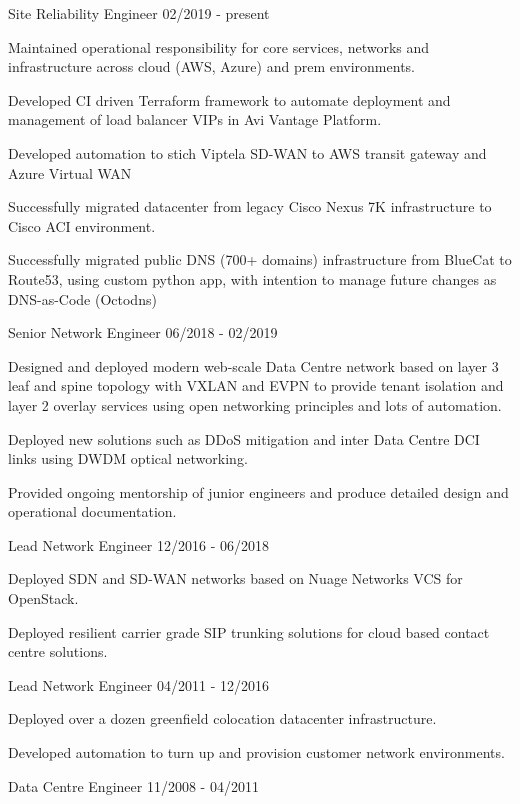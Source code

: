 \documentclass[11pt]{article} %
\begin{document}
\begin{description}
\squish
{}
           {Site Reliability Engineer}
           {02/2019 - present}

Maintained operational responsibility for core services, networks and infrastructure across cloud (AWS, Azure) and prem environments.

Developed CI driven Terraform framework to automate deployment and management of load balancer VIPs in Avi Vantage Platform.

Developed automation to stich Viptela SD-WAN to AWS transit gateway and Azure Virtual WAN

Successfully migrated datacenter from legacy Cisco Nexus 7K infrastructure to Cisco ACI environment.

Successfully migrated public DNS (700+ domains) infrastructure from BlueCat to Route53, using custom python app, with intention to manage future changes as DNS-as-Code (Octodns)

           {Senior Network Engineer}
           {06/2018 - 02/2019}

Designed and deployed modern web-scale Data Centre network based on layer 3 leaf and spine topology with VXLAN and EVPN to provide tenant isolation and layer 2 overlay services using open networking principles and lots of automation.

Deployed new solutions such as DDoS mitigation and inter Data Centre DCI links using DWDM optical networking.

Provided ongoing mentorship of junior engineers and produce detailed design and operational documentation.  
           
           {Lead Network Engineer}
           {12/2016 - 06/2018}

Deployed SDN and SD-WAN networks based on Nuage Networks VCS for OpenStack.

Deployed resilient carrier grade SIP trunking solutions for cloud based contact centre solutions. 

           {Lead Network Engineer}
           {04/2011 - 12/2016}

Deployed over a dozen greenfield colocation datacenter infrastructure.

Developed automation to turn up and provision customer network environments.

           {Data Centre Engineer}
           {11/2008 - 04/2011}


\end{description}
\end{document}
